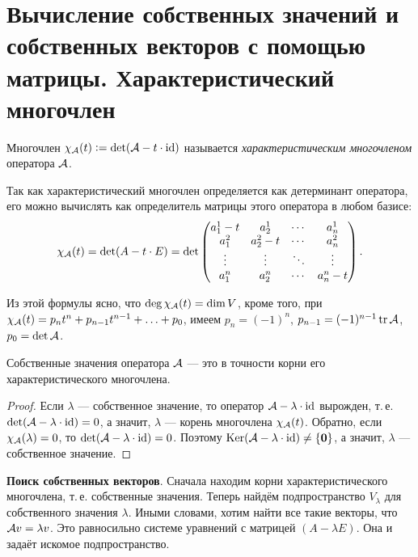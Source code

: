 \section{Вычисление собственных значений и собственных векторов с помощью матрицы. Характеристический многочлен}

\begin{definition}
    Многочлен $\chi_{\mathcal{A}}(t) \vcentcolon = \det(\mathcal{A} - t \cdot \mathrm{id})$ называется \textit{характеристическим многочленом} оператора $\mathcal{A}$.
\end{definition}

Так как характеристический многочлен определяется как детерминант оператора, его можно вычислять как определитель матрицы этого оператора в любом базисе:
\[
    \chi_{\mathcal{A}}(t) = \det(A - t \cdot E) = \det
    \begin{pmatrix}
        a^1_1 - t & a^1_2 & \cdots & a^1_n\\
        a^2_1 & a^2_2 - t & \cdots & a^2_n\\
        \vdots & \vdots & \ddots & \vdots\\
        a^n_1 & a^n_2 & \cdots & a^n_n - t\\
    \end{pmatrix}.
\]

Из этой формулы ясно, что $\deg\chi_{\mathcal{A}}(t) = \dim V$, кроме того, при $\chi_{\mathcal{A}}(t) = p_nt^n + p_{n - 1}t^{n - 1} + \ldots + p_0$, имеем $p_n = (-1)^n$, $p_{n - 1} = (-1)^{n - 1}\operatorname{tr}\mathcal{A}$, $p_0 = \det\mathcal{A}$.

\begin{proposal}
    Собственные значения оператора $\mathcal{A}$ --- это в точности корни его характеристического многочлена.
\end{proposal}

\begin{proof}
    Если $\lambda$ --- собственное значение, то оператор $\mathcal{A} - \lambda \cdot \mathrm{id}$ вырожден, т.\,е. $\det(\mathcal{A} - \lambda \cdot \mathrm{id}) = 0$, а значит, $\lambda$ --- корень многочлена $\chi_{\mathcal{A}}(t)$. Обратно, если $\chi_{\mathcal{A}}(\lambda) = 0$, то $\det(\mathcal{A} - \lambda \cdot \mathrm{id}) = 0$. Поэтому $\operatorname{Ker}(\mathcal{A} - \lambda \cdot \mathrm{id}) \ne \{\boldsymbol{0}\}$, а значит, $\lambda$ --- собственное значение.
\end{proof}

\textbf{Поиск собственных векторов}. Сначала находим корни характеристического многочлена, т.\,е. собственные значения. Теперь найдём подпространство $V_\lambda$ для собственного значения $\lambda$. Иными словами, хотим найти все такие векторы, что $\mathcal{A} v = \lambda v$. Это равносильно системе уравнений с матрицей $(A - \lambda E)$. Она и задаёт искомое подпространство.
